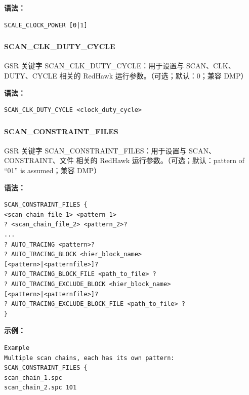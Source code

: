 \textbf{语法：}
\begin{lstlisting}
SCALE_CLOCK_POWER [0|1]
\end{lstlisting}

\subsubsection{}
\paragraph*{SCAN_CLK_DUTY_CYCLE}

GSR 关键字 SCAN_CLK_DUTY_CYCLE：用于设置与 SCAN、CLK、DUTY、CYCLE 相关的 RedHawk 运行参数。（可选；默认：0；兼容 DMP）

\textbf{语法：}
\begin{lstlisting}
SCAN_CLK_DUTY_CYCLE <clock_duty_cycle>
\end{lstlisting}

\subsubsection{}
\paragraph*{SCAN_CONSTRAINT_FILES}

GSR 关键字 SCAN_CONSTRAINT_FILES：用于设置与 SCAN、CONSTRAINT、文件 相关的 RedHawk 运行参数。（可选；默认：pattern of “01” is assumed；兼容 DMP）

\textbf{语法：}
\begin{lstlisting}
SCAN_CONSTRAINT_FILES {
<scan_chain_file_1> <pattern_1>
? <scan_chain_file_2> <pattern_2>?
...
? AUTO_TRACING <pattern>?
? AUTO_TRACING_BLOCK <hier_block_name>
[<pattern>|<patternfile>]?
? AUTO_TRACING_BLOCK_FILE <path_to_file> ?
? AUTO_TRACING_EXCLUDE_BLOCK <hier_block_name>
[<pattern>|<patternfile>]?
? AUTO_TRACING_EXCLUDE_BLOCK_FILE <path_to_file> ?
}
\end{lstlisting}

\textbf{示例：}
\begin{lstlisting}
Example
Multiple scan chains, each has its own pattern:
SCAN_CONSTRAINT_FILES {
scan_chain_1.spc
scan_chain_2.spc 101
\end{lstlisting}

\subsubsection{}
